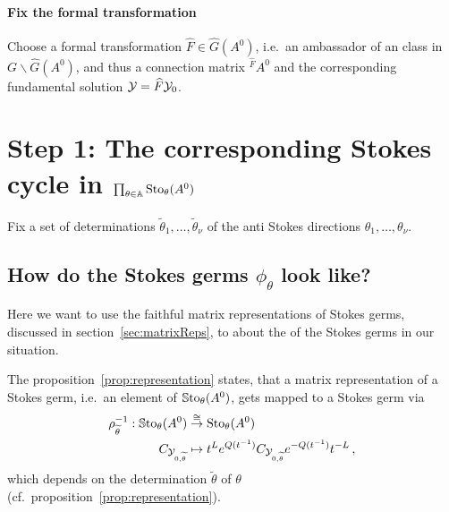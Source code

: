 \paragraph{Fix the formal transformation}
Choose a formal transformation $\hat F\in\hat G(A^0)$, i.e.\ an ambassador of
an class in $G\backslash\hat G(A^0)$, and thus a connection matrix
${}^{\hat F}\!A^0$ and the corresponding fundamental solution
$\mathcal{Y}=\widehat F\mathcal{Y}_0$.

\begin{comment}
  From the theorem~\ref{thm:summaFaktori} we know in our case, that $\hat F$
  can be factored in
  \[
    \hat F=\hat F_1 \hat F_2
  \]
  where $\hat F_j\in\hat G(A^0)$ is
  \begin{itemize}
    \item $k_j$-summable and
    \item with singular directions belonging to $\A^{k_j}$.
  \end{itemize}
  \TODO[build this way?]
\end{comment}

\section{Step 1: The corresponding Stokes cycle in
  $\prod_{\theta\in\mathbb{A}}\operatorname{Sto}_\theta(A^0)$}
\begin{comment}
  \textbf{summability:}
  \cite[III.2]{Loday1994} \cite[78f,80]{Loday2014} (\cite[9]{thboalch} only
  mentions multisummability)
\end{comment}
Fix a set of determinations $\tilde\theta_1,\dots,\tilde\theta_\nu$ of the
anti Stokes directions $\theta_1 ,\dots,\theta_\nu$.

\subsection{How do the Stokes germs $\phi_\theta$ look like?}
Here we want to use the faithful matrix representations of Stokes germs,
discussed in section~\ref{sec:matrixReps}, to 
about the  of the Stokes germs in our situation.

The proposition~\ref{prop:representation} states, that a matrix representation
of a Stokes germ, i.e.\ an element of $\operatorname{\mathbb{S}to}_\theta(A^0)$, gets mapped to a
Stokes germ via
\begin{align*}
  \rho_{\widetilde\theta}^{-1}:
  \operatorname{\mathbb{S}to}_\theta(A^0)
  &\overset{\cong}\to
  \operatorname{Sto}_\theta(A^0)
  \\C_{\mathcal{Y}_{0,\widetilde\theta}} &\mapsto
  t^{L}e^{Q(t^{-1})}C_{\mathcal{Y}_{0,\widetilde\theta}} e^{-Q(t^{-1})}t^{-L} \,,
\end{align*}
which depends on the determination $\tilde\theta$ of $\theta$ 
(cf.\ proposition~\ref{prop:representation}).

